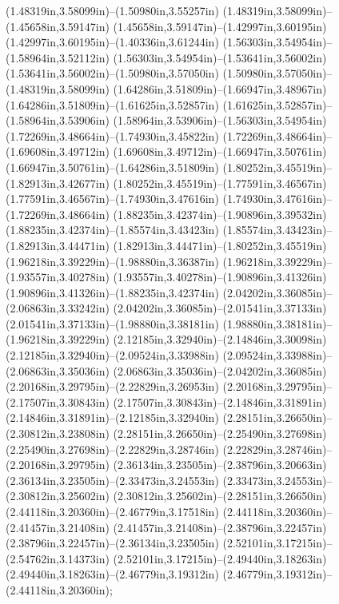 (1.48319in,3.58099in)--(1.50980in,3.55257in) (1.48319in,3.58099in)--(1.45658in,3.59147in) (1.45658in,3.59147in)--(1.42997in,3.60195in) (1.42997in,3.60195in)--(1.40336in,3.61244in) (1.56303in,3.54954in)--(1.58964in,3.52112in) (1.56303in,3.54954in)--(1.53641in,3.56002in) (1.53641in,3.56002in)--(1.50980in,3.57050in) (1.50980in,3.57050in)--(1.48319in,3.58099in) (1.64286in,3.51809in)--(1.66947in,3.48967in) (1.64286in,3.51809in)--(1.61625in,3.52857in) (1.61625in,3.52857in)--(1.58964in,3.53906in) (1.58964in,3.53906in)--(1.56303in,3.54954in) (1.72269in,3.48664in)--(1.74930in,3.45822in) (1.72269in,3.48664in)--(1.69608in,3.49712in) (1.69608in,3.49712in)--(1.66947in,3.50761in) (1.66947in,3.50761in)--(1.64286in,3.51809in) (1.80252in,3.45519in)--(1.82913in,3.42677in) (1.80252in,3.45519in)--(1.77591in,3.46567in) (1.77591in,3.46567in)--(1.74930in,3.47616in) (1.74930in,3.47616in)--(1.72269in,3.48664in) (1.88235in,3.42374in)--(1.90896in,3.39532in) (1.88235in,3.42374in)--(1.85574in,3.43423in) (1.85574in,3.43423in)--(1.82913in,3.44471in) (1.82913in,3.44471in)--(1.80252in,3.45519in) (1.96218in,3.39229in)--(1.98880in,3.36387in) (1.96218in,3.39229in)--(1.93557in,3.40278in) (1.93557in,3.40278in)--(1.90896in,3.41326in) (1.90896in,3.41326in)--(1.88235in,3.42374in) (2.04202in,3.36085in)--(2.06863in,3.33242in) (2.04202in,3.36085in)--(2.01541in,3.37133in) (2.01541in,3.37133in)--(1.98880in,3.38181in) (1.98880in,3.38181in)--(1.96218in,3.39229in) (2.12185in,3.32940in)--(2.14846in,3.30098in) (2.12185in,3.32940in)--(2.09524in,3.33988in) (2.09524in,3.33988in)--(2.06863in,3.35036in) (2.06863in,3.35036in)--(2.04202in,3.36085in) (2.20168in,3.29795in)--(2.22829in,3.26953in) (2.20168in,3.29795in)--(2.17507in,3.30843in) (2.17507in,3.30843in)--(2.14846in,3.31891in) (2.14846in,3.31891in)--(2.12185in,3.32940in) (2.28151in,3.26650in)--(2.30812in,3.23808in) (2.28151in,3.26650in)--(2.25490in,3.27698in) (2.25490in,3.27698in)--(2.22829in,3.28746in) (2.22829in,3.28746in)--(2.20168in,3.29795in) (2.36134in,3.23505in)--(2.38796in,3.20663in) (2.36134in,3.23505in)--(2.33473in,3.24553in) (2.33473in,3.24553in)--(2.30812in,3.25602in) (2.30812in,3.25602in)--(2.28151in,3.26650in) (2.44118in,3.20360in)--(2.46779in,3.17518in) (2.44118in,3.20360in)--(2.41457in,3.21408in) (2.41457in,3.21408in)--(2.38796in,3.22457in) (2.38796in,3.22457in)--(2.36134in,3.23505in) (2.52101in,3.17215in)--(2.54762in,3.14373in) (2.52101in,3.17215in)--(2.49440in,3.18263in) (2.49440in,3.18263in)--(2.46779in,3.19312in) (2.46779in,3.19312in)--(2.44118in,3.20360in);
